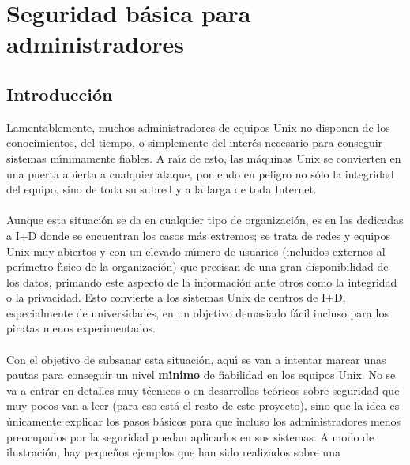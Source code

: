 %
\chapter{Seguridad b\'asica para administradores}
\section{Introducci\'on}
Lamentablemente, muchos administradores de equipos Unix no disponen de los
conocimientos, del tiempo, o simplemente del inter\'es necesario para 
conseguir sistemas m\'{\i}nimamente fiables. A ra\'{\i}z de esto, las 
m\'aquinas Unix se convierten en una puerta abierta a cualquier ataque, poniendo
en peligro no s\'olo la integridad del equipo, sino de toda su subred y a la 
larga de toda Internet.\\
\\Aunque esta situaci\'on se da en cualquier tipo de organizaci\'on, es en las
dedicadas a I+D donde se encuentran los casos m\'as extremos; se trata de redes 
y equipos Unix muy abiertos y con un elevado n\'umero de usuarios (incluidos 
externos al per\'{\i}metro f\'{\i}sico de la organizaci\'on) que precisan de 
una gran disponibilidad de los datos, primando este aspecto de la informaci\'on 
ante otros como la integridad o la privacidad. Esto convierte a los sistemas 
Unix de centros de I+D, especialmente de universidades, en un objetivo 
demasiado f\'acil incluso para los piratas menos experimentados.\\
\\Con el objetivo de subsanar esta situaci\'on, aqu\'{\i} se van a intentar 
marcar unas pautas para conseguir un nivel {\bf m\'{\i}nimo} de fiabilidad en 
los equipos Unix. No se va a entrar en detalles muy t\'ecnicos o en desarrollos 
te\'oricos sobre seguridad que muy pocos van a leer (para eso est\'a el resto
de este proyecto), sino que la idea es 
\'unicamente explicar los pasos b\'asicos para que incluso los administradores 
menos preocupados por la seguridad puedan aplicarlos en sus sistemas. A modo de
ilustraci\'on, hay peque\~nos ejemplos que han sido realizados sobre una 
